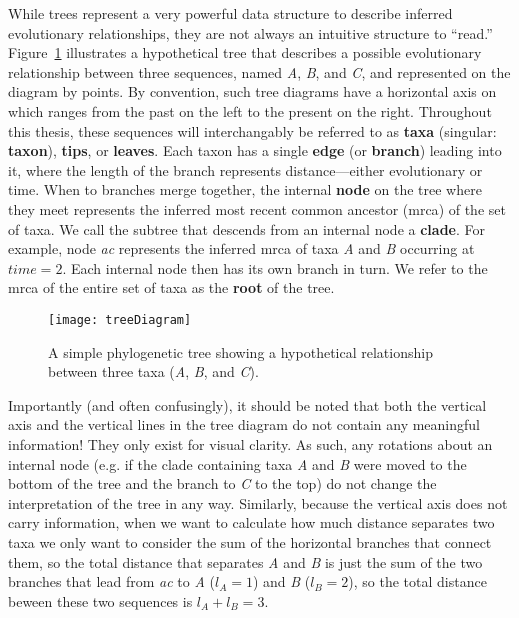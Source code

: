 While trees represent a very powerful data structure to describe inferred evolutionary relationships, they are not always an intuitive structure to ``read.''
Figure~\ref{fig:treeDiagram} illustrates a hypothetical tree that describes a possible evolutionary relationship between three sequences, named \textit{A}, \textit{B}, and \textit{C}, and represented on the diagram by points.
By convention, such tree diagrams have a horizontal axis on which ranges from the past on the left to the present on the right.
Throughout this thesis, these sequences will interchangably be referred to as \textbf{taxa} (singular: \textbf{taxon}), \textbf{tips}, or \textbf{leaves}.
Each taxon has a single \textbf{edge} (or \textbf{branch}) leading into it, where the length of the branch represents distance---either evolutionary or time.
When to branches merge together, the internal \textbf{node} on the tree where they meet represents the inferred most recent common ancestor (\gls{mrca}) of the set of taxa.
We call the subtree that descends from an internal node a \textbf{clade}.
For example, node \textit{ac} represents the inferred \gls{mrca} of taxa \textit{A} and \textit{B} occurring at $time=2$.
Each internal node then has its own branch in turn.
We refer to the \gls{mrca} of the entire set of taxa as the \textbf{root} of the tree. 

\begin{figure}[ht]
  \centering
  \texttt{[image: treeDiagram]}
  \caption[Example phylogenetic tree]{A simple phylogenetic tree showing a hypothetical relationship between three taxa (\textit{A}, \textit{B}, and \textit{C}).
  }
  \label{fig:treeDiagram}
\end{figure}

Importantly (and often confusingly), it should be noted that both the vertical axis and the vertical lines in the tree diagram do not contain any meaningful information!
They only exist for visual clarity.
As such, any rotations about an internal node (e.g. if the clade containing taxa \textit{A} and \textit{B} were moved to the bottom of the tree and the branch to \textit{C} to the top) do not change the interpretation of the tree in any way.
Similarly, because the vertical axis does not carry information, when we want to calculate how much distance separates two taxa we only want to consider the sum of the horizontal branches that connect them, so the total distance that separates \textit{A} and \textit{B} is just the sum of the two branches that lead from \textit{ac} to \textit{A} ($l_A=1$) and \textit{B} ($l_B=2$), so the total distance beween these two sequences is $l_A + l_B = 3$.

